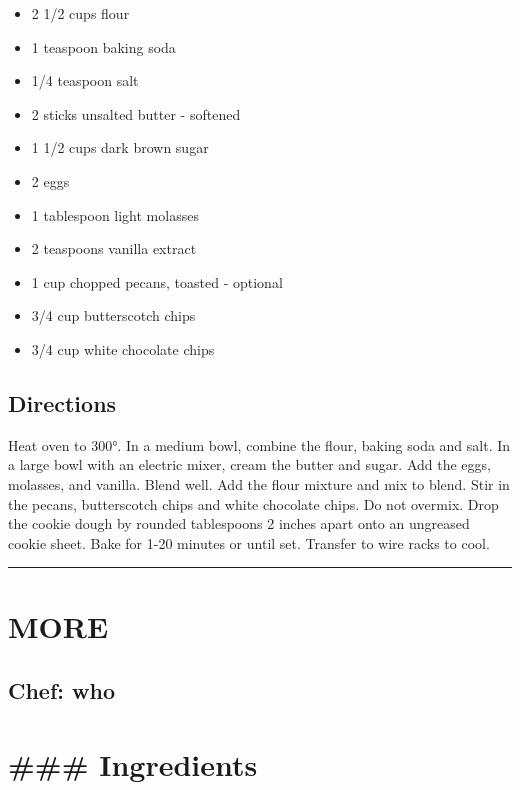 \documentclass[
]{book}
\providecommand{\tightlist}{%
  \setlength{\itemsep}{0pt}\setlength{\parskip}{0pt}}
\begin{document}
\begin{itemize}
\tightlist
\item
  2 1/2 cups flour
\item
  1 teaspoon baking soda
\item
  1/4 teaspoon salt
\item
  2 sticks unsalted butter - softened
\item
  1 1/2 cups dark brown sugar
\item
  2 eggs
\item
  1 tablespoon light molasses
\item
  2 teaspoons vanilla extract
\item
  1 cup chopped pecans, toasted - optional
\item
  3/4 cup butterscotch chips
\item
  3/4 cup white chocolate chips
\end{itemize}

\hypertarget{directions-108}{%
\subsection*{Directions}\label{directions-108}}


Heat oven to 300°. In a medium bowl, combine the flour, baking soda and salt. In a large bowl with an electric mixer, cream the butter and sugar. Add the eggs, molasses, and vanilla. Blend well. Add the flour mixture and mix to blend. Stir in the pecans, butterscotch chips and white chocolate chips. Do not overmix. Drop the cookie dough by rounded tablespoons 2 inches apart onto an ungreased cookie sheet. Bake for 1-20 minutes or until set. Transfer to wire racks to cool.

\begin{center}\rule{0.5\linewidth}{0.5pt}\end{center}

\hypertarget{more-6}{%
\section*{MORE}\label{more-6}}


\hypertarget{chef-who-6}{%
\subsection*{Chef: who}\label{chef-who-6}}


\hypertarget{ingredients-109}{%
\section*{\#\#\# Ingredients}\label{ingredients-109}}
\end{document}
